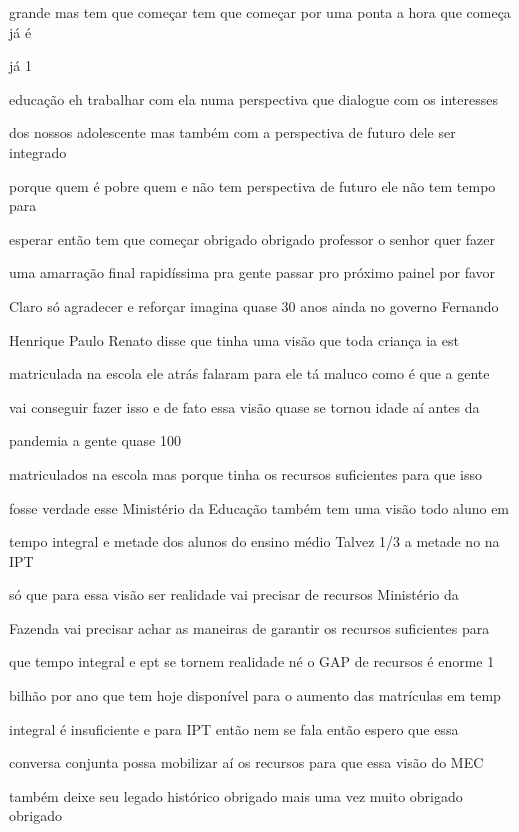 \documentclass[a4paper,12pt]{article}
\begin{document}
grande mas tem que começar tem que começar por uma ponta a hora que começa já é

já 1%

educação eh trabalhar com ela numa perspectiva que dialogue com os interesses

dos nossos adolescente mas também com a perspectiva de futuro dele ser integrado

porque quem é pobre quem e não tem perspectiva de futuro ele não tem tempo para

esperar então tem que começar obrigado obrigado professor o senhor quer fazer

uma amarração final rapidíssima pra gente passar pro próximo painel por favor

Claro só agradecer e reforçar imagina quase 30 anos ainda no governo Fernando

Henrique Paulo Renato disse que tinha uma visão que toda criança ia est

matriculada na escola ele atrás falaram para ele tá maluco como é que a gente

vai conseguir fazer isso e de fato essa visão quase se tornou idade aí antes da

pandemia a gente quase 100%

matriculados na escola mas porque tinha os recursos suficientes para que isso

fosse verdade esse Ministério da Educação também tem uma visão todo aluno em

tempo integral e metade dos alunos do ensino médio Talvez 1/3 a metade no na IPT

só que para essa visão ser realidade vai precisar de recursos Ministério da

Fazenda vai precisar achar as maneiras de garantir os recursos suficientes para

que tempo integral e ept se tornem realidade né o GAP de recursos é enorme 1

bilhão por ano que tem hoje disponível para o aumento das matrículas em temp

integral é insuficiente e para IPT então nem se fala então espero que essa

conversa conjunta possa mobilizar aí os recursos para que essa visão do MEC

também deixe seu legado histórico obrigado mais uma vez muito obrigado obrigado
\end{document}
